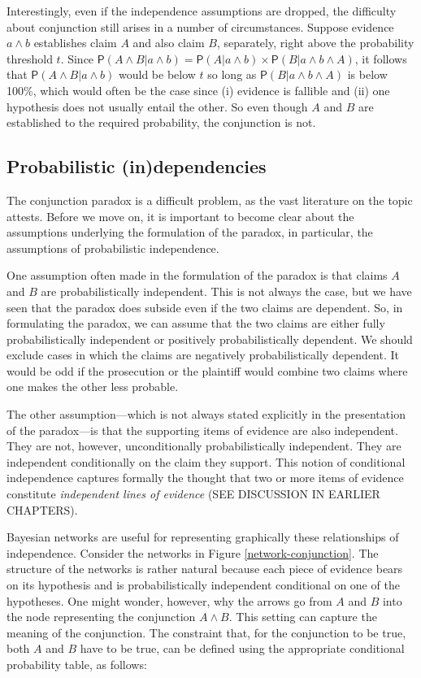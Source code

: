 \documentclass[10pt,dvipsnames,enabledeprecatedfontcommands]{scrartcl}
\newcommand{\et}{\wedge}
\newcommand{\pr}[1]{\mathsf{P}(#1)}
\begin{document}
Interestingly, even if the independence assumptions are dropped, the
difficulty about conjunction still arises in a number of circumstances.
Suppose evidence \(a\et b\) establishes claim \(A\) and also claim
\(B\), separately, right above the probability threshold \(t\). Since
\(\pr{A \wedge B | a \wedge b} =\pr{A |a \wedge b} \times \pr{B | a \wedge b \wedge A}\),
it follows that \(\pr{A \wedge B | a \wedge b}\) would be below \(t\) so
long as \(\pr{B | a \wedge b \wedge A}\) is below 100\%, which would
often be the case since (i) evidence is fallible and (ii) one hypothesis
does not usually entail the other. So even though \(A\) and \(B\) are
established to the required probability, the conjunction is not.

\subsection{Probabilistic
(in)dependencies}\label{probabilistic-independencies}

The conjunction paradox is a difficult problem, as the vast literature
on the topic attests. Before we move on, it is important to become clear
about the assumptions underlying the formulation of the paradox, in
particular, the assumptions of probabilistic independence.

One assumption often made in the formulation of the paradox is that
claims \(A\) and \(B\) are probabilistically independent. This is not
always the case, but we have seen that the paradox does subside even if
the two claims are dependent. So, in formulating the paradox, we can
assume that the two claims are either fully probabilistically
independent or positively probabilistically dependent. We should exclude
cases in which the claims are negatively probabilistically dependent. It
would be odd if the prosecution or the plaintiff would combine two
claims where one makes the other less probable.

The other assumption---which is not always stated explicitly in the
presentation of the paradox---is that the supporting items of evidence
are also independent. They are not, however, unconditionally
probabilistically independent. They are independent conditionally on the
claim they support. This notion of conditional independence captures
formally the thought that two or more items of evidence constitute
\textit{independent lines of evidence} (SEE DISCUSSION IN EARLIER
CHAPTERS).

Bayesian networks are useful for representing graphically these
relationships of independence. Consider the networks in Figure
\ref{network-conjunction}. The structure of the networks is rather
natural because each piece of evidence bears on its hypothesis and is
probabilistically independent conditional on one of the hypotheses. One
might wonder, however, why the arrows go from \(A\) and \(B\) into the
node representing the conjunction \(A\wedge B\). This setting can
capture the meaning of the conjunction. The constraint that, for the
conjunction to be true, both \(A\) and \(B\) have to be true, can be
defined using the appropriate conditional probability table, as follows:
\end{document}
